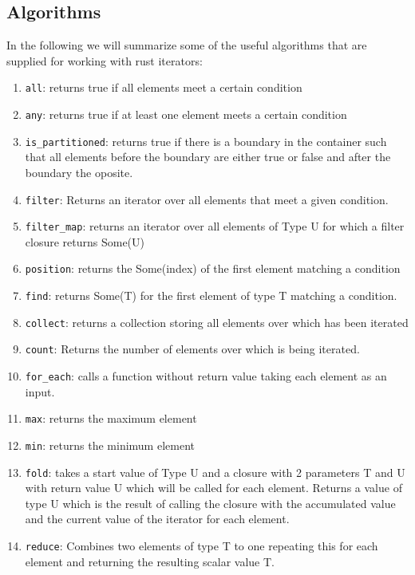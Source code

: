     \subsection{Algorithms}

    In the following we will summarize some of the useful algorithms that are supplied for working with rust iterators:

    \begin{enumerate}
        \item \lstinline{all}: returns true if all elements meet a certain condition
        \item \lstinline{any}: returns true if at least one element meets a certain condition
        \item \lstinline{is_partitioned}: returns true if there is a boundary in the container such that all elements before the boundary are either true or false and after the boundary the oposite.
        \item \lstinline{filter}: Returns an iterator over all elements that meet a given condition.
        \item \lstinline{filter_map}: returns an iterator over all elements of Type U for which a filter closure returns Some(U)
        \item \lstinline{position}: returns the Some(index) of the first element matching a condition
        \item \lstinline{find}: returns Some(T) for the first element of type T matching a condition.
        \item \lstinline{collect}: returns a collection storing all elements over which has been iterated
        \item \lstinline{count}: Returns the number of elements over which is being iterated.
        \item \lstinline{for_each}: calls a function without return value taking each element as an input.
        \item \lstinline{max}: returns the maximum element
        \item \lstinline{min}: returns the minimum element
        \item \lstinline{fold}: takes a start value of Type U and a closure with 2 parameters T and U with return value U which will be called for each element. Returns a value of type U which is the result of calling the closure with the accumulated value and the current value of the iterator for each element.
        \item \lstinline{reduce}: Combines two elements of type T to one repeating this for each element and returning the resulting scalar value T.

\end{enumerate}
